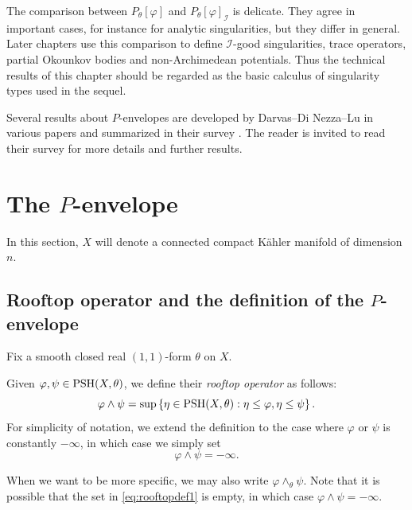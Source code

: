 The comparison between $P_\theta[\varphi]$ and $P_\theta[\varphi]_{\mathcal I}$ is delicate. They agree in important cases, for instance for analytic singularities, but they differ in general. Later chapters use this comparison to define $\mathcal I$-good singularities, trace operators, partial Okounkov bodies and non-Archimedean potentials. Thus the technical results of this chapter should be regarded as the basic calculus of singularity types used in the sequel.

Several results about $P$-envelopes are developed by Darvas--Di Nezza--Lu in various papers and summarized in their survey \cite{DDNLsurv}. The reader is invited to read their survey for more details and further results.

\section{The \texorpdfstring{$P$}{P}-envelope}\label{sec:Penv}
In this section, $X$ will denote a connected compact Kähler manifold of dimension $n$.


\subsection{Rooftop operator and the definition of the \texorpdfstring{$P$}{P}-envelope}
\label{subsec:rooftop_Penv}

Fix a smooth closed real $(1,1)$-form $\theta$ on $X$.


\begin{definition}\label{def:rooftop}
    Given $\varphi,\psi\in \mathrm{PSH}(X,\theta)$, we define their \emph{rooftop operator} as follows:
    \begin{equation}\label{eq:rooftopdef1}
    \varphi\land\psi=\sup\left\{\eta\in \mathrm{PSH}(X,\theta):\eta\leq \varphi,\eta\leq \psi\right\}.
    \end{equation}
    \index{$\varphi\land \psi$}
    For simplicity of notation, we extend the definition to the case where $\varphi$ or $\psi$ is constantly $-\infty$, in which case we simply set
    \[
    \varphi\land \psi=-\infty.
    \]
\end{definition}
When we want to be more specific, we may also write $\varphi\land_{\theta}\psi$. Note that it is possible that the set in \eqref{eq:rooftopdef1} is empty, in which case $\varphi\land \psi=-\infty$.


